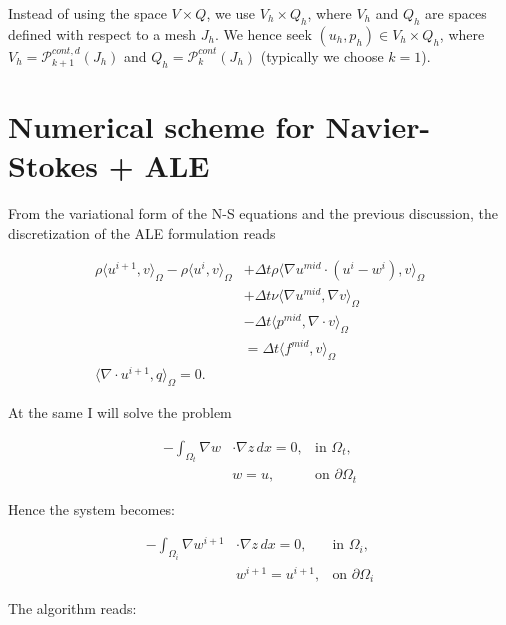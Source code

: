 \documentclass[11pt,a4paper,titlepage]{report}
\begin{document}
Instead of using the space $V \times Q$, we use $V_h \times Q_h$, where $V_h$ and $Q_h$ are spaces defined with respect to a mesh $J_h$. We hence seek $(u_h, p_h) \in V_h \times Q_h$, where $V_h = \mathcal{P}^{cont,d}_{k+1} (J_h)$ and $Q_h = \mathcal{P}^{cont}_{k} (J_h)$ (typically we choose $k=1$). \\

\section{Numerical scheme for Navier-Stokes + ALE}
From the variational form of the N-S equations and the previous discussion, the discretization of the ALE formulation reads

\[
\begin{aligned}
\rho \langle u^{i+1},v \rangle_\Omega - \rho \langle u^i, v \rangle_\Omega & + \Delta t \rho \langle \nabla u^{mid} \cdot (u^i -w^i)  ,v \rangle_\Omega \\
& + \Delta t \nu \langle \nabla u^{mid}, \nabla v \rangle_\Omega \\
& - \Delta t \langle p^{mid} , \nabla \cdot v \rangle_\Omega \\
& = \Delta t \langle f^{mid} ,v \rangle_\Omega \\
\langle \nabla \cdot u^{i+1},q \rangle_\Omega = 0.
\end{aligned}
\]

At the same I will solve the problem

\[
\begin{aligned}
-  \int_{\Omega_t} \nabla w & \cdot \nabla z \, dx = 0, & \text{in } \Omega_t, \\
& w = u, & \text{on } \partial \Omega_t
\end{aligned}
\]

Hence the system becomes:

\[
\begin{aligned}
-  \int_{\Omega_i} \nabla w^{i+1} & \cdot \nabla z \, dx = 0, & \text{in } \Omega_i, \\
& w^{i+1} = u^{i+1}, & \text{on } \partial \Omega_i
\end{aligned}
\]

The algorithm reads:
\end{document}
